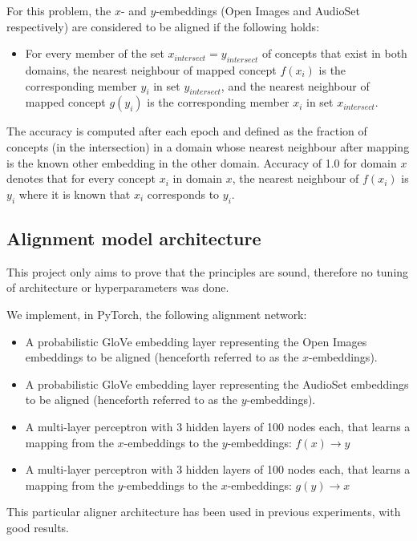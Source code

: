 For this problem, the $x$- and $y$-embeddings (Open Images and AudioSet respectively) are considered to be aligned if the following holds:

\begin{itemize}
    \item For every member of the set $x_{intersect} = y_{intersect}$ of concepts that exist in both domains, the nearest neighbour of mapped concept $f(x_i)$ is the corresponding member $y_i$ in set $y_{intersect}$, and the nearest neighbour of mapped concept $g(y_i)$ is the corresponding member $x_i$ in set $x_{intersect}$. 
\end{itemize}

The accuracy is computed after each epoch and defined as the fraction of concepts (in the intersection) in a domain whose nearest neighbour after mapping is the known other embedding in the other domain. Accuracy of 1.0 for domain $x$ denotes that for every concept $x_i$ in domain $x$, the nearest neighbour of $f(x_i)$ is $y_i$ where it is known that $x_i$ corresponds to $y_i$. 

\subsection{Alignment model architecture}

This project only aims to prove that the principles are sound, therefore no tuning of architecture or hyperparameters was done. 

We implement, in PyTorch, the following alignment network: 

\begin{itemize}
    \item A probabilistic GloVe embedding layer representing the Open Images embeddings to be aligned (henceforth referred to as the $x$-embeddings). 
    \item A probabilistic GloVe embedding layer representing the AudioSet embeddings to be aligned (henceforth referred to as the $y$-embeddings). 
    \item A multi-layer perceptron with 3 hidden layers of 100 nodes each, that learns a mapping from the $x$-embeddings to the $y$-embeddings: $f(x) \rightarrow y$ 
    \item A multi-layer perceptron with 3 hidden layers of 100 nodes each, that learns a mapping from the $y$-embeddings to the $x$-embeddings: $g(y) \rightarrow x$
\end{itemize}

This particular aligner architecture has been used in previous experiments, with good results. 

